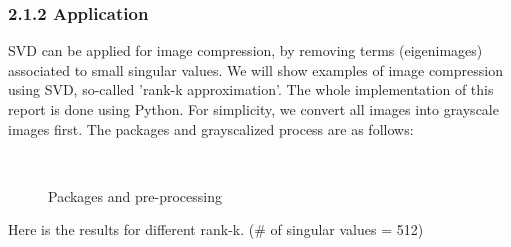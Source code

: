 \documentclass[12pt]{article}
\begin{document}
\subsubsection*{2.1.2 \quad Application}
SVD can be applied for image compression, by removing terms (eigenimages) associated to small singular values.
We will show examples of image compression using SVD, so-called 'rank-k approximation'. The whole implementation of 
this report is done using Python. For simplicity, we convert all images into grayscale images first. The packages and 
grayscalized process are as follows:
\begin{figure}[H]
    \centering
    \\
    \caption{Packages and pre-processing}
\end{figure}
\begin{flushleft}
Here is the results for different rank-k. (\# of singular values = 512)  
\end{flushleft}
\end{document}
